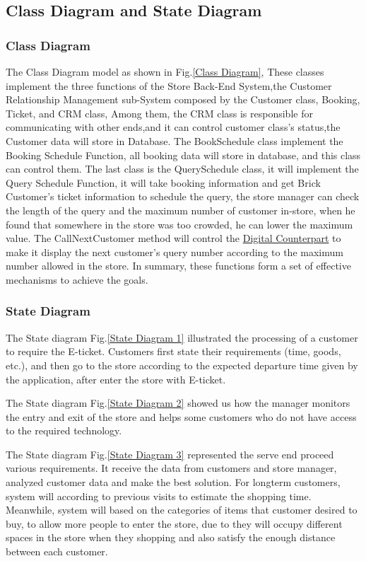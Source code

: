 \documentclass[a4paper,12pt]{book}
\begin{document}
\subsection{Class Diagram and State Diagram}
\subsubsection{Class Diagram}
The Class Diagram model as shown in Fig.\ref{Class Diagram}, These classes implement the three functions of the Store Back-End System,the Customer Relationship Management sub-System composed by the  Customer class, Booking, Ticket, and CRM class, Among them, the CRM class is responsible for communicating with other ends,and it can control customer class's status,the Customer data will store in Database. The BookSchedule class implement the Booking Schedule Function, all booking data will store in database, and this class can control them. The last class is the QuerySchedule class, it will implement the Query Schedule Function, it will take booking information and get Brick Customer's ticket information to schedule the query, the store manager can check the length of the query and the maximum number of customer in-store, when he found that somewhere in the store was too crowded, he can lower the maximum value. The CallNextCustomer method will control the \hyperref[Definitions]{Digital Counterpart} to make it display the next customer's query number according to the maximum number allowed in the store. In summary, these functions form a set of effective mechanisms to achieve the goals.



\subsubsection{State Diagram}
The State diagram Fig.\ref{State Diagram 1} illustrated the processing of a customer to require the E-ticket. Customers first state their requirements (time, goods, etc.), and then go to the store according to the expected departure time given by the application, after enter the store with E-ticket.

The State diagram Fig.\ref{State Diagram 2} showed us how the manager monitors the entry and exit of the store and helps some customers who do not have access to the required technology.

The State diagram Fig.\ref{State Diagram 3} represented the serve end proceed various requirements. It receive the data from customers and store manager, analyzed customer data and make the best solution. For longterm customers, system will according to previous visits to estimate the shopping time. Meanwhile, system will based on the categories of items that customer desired to buy, to allow more people to enter the store, due to they will occupy different spaces in the store when they shopping and also satisfy the enough distance between each customer.
\end{document}
